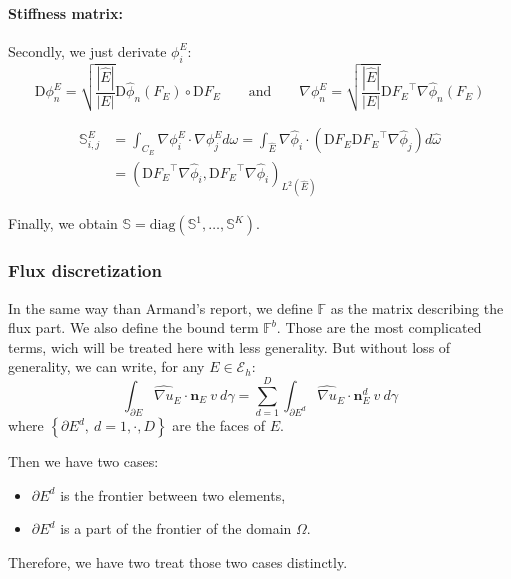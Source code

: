 \documentclass[a4paper,10pt]{article}
\begin{document}
\paragraph{Stiffness matrix:} Secondly, we just derivate $\phi_i^E$:
\begin{equation*}
 \mathrm{D}\phi_n^E = \sqrt{\frac{|\hat E|}{|E|}} \mathrm{D}\hat \phi_n(F_E) \circ \mathrm{D} F_E 
\qquad \text{and} \qquad \nabla \phi_n^E = \sqrt{\frac{|\hat E|}{|E|}} {\mathrm{D} F_E}^\top 
\nabla \hat \phi_n(F_E) 
\end{equation*}

\begin{align*}
 \mathbb{S}_{i,j}^E &= \int_{C_E} \nabla \phi_i^E \cdot \nabla \phi_j^E d\omega = 
\int_{\hat E} \nabla \hat \phi_i \cdot ( \mathrm{D} F_E{\mathrm{D} F_E}^\top \nabla \hat 
\phi_j) d\hat \omega \\
&= \left( {\mathrm{D} F_E}^\top \nabla \hat \phi_i , {\mathrm{D} F_E}^\top \nabla \hat \phi_i  
\right)_{L^2(\hat E)}
\end{align*}

Finally, we obtain $\mathbb{S} = \mathrm{diag} (\mathbb{S}^1,\dots,\mathbb{S}^K)$.

\subsubsection{Flux discretization}

In the same way than Armand's report, we define $\mathbb{F}$ as the matrix describing the flux 
part. We also define the bound  term $\mathbb{F}^b$. Those are the most complicated terms, wich will 
be treated here with less generality. But without loss of generality, we can write, for any $E\in 
\mathcal{E}_h$:
\begin{equation*}
 \int_{\partial E} \widehat{\nabla u}_E \cdot \mathbf{n}_E\ v\ d\gamma 
 = \sum_{d=1}^D \int_{\partial E^d} \widehat{\nabla u}_E \cdot \mathbf{n}_E^d\ v\ d\gamma
\end{equation*}
where $\left\{ \partial E^d,\ d=1,\cdot,D \right\}$ are the faces of $E$.

Then we have two cases:
\begin{itemize}
 \item $\partial E^d$ is the frontier between two elements,
 \item $\partial E^d$ is a part of the frontier of the domain $\Omega$.
\end{itemize}
Therefore, we have two treat those two cases distinctly.
\end{document}
